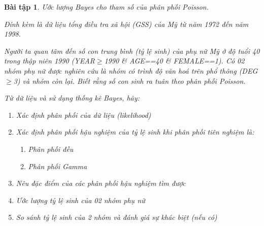 \documentclass[14pt, a4paper]{article}
\theoremstyle{sltheorem}
\newtheorem{baitap}{Bài tập}
\theoremstyle{soltheorem}
\begin{document}
\begin{titlepage}





    \vfill %

\end{titlepage}

\nocite{*}

\newpage

\begin{baitap}
    Ước lượng Bayes cho tham số của phân phối Poisson.

    Đính kèm là dữ liệu tổng điều tra xã hội (GSS) của Mỹ từ năm 1972 đến năm 1998.

    Người ta quan tâm đến số con trung bình (tỷ lệ sinh) của phụ nữ Mỹ ở độ tuổi 40 trong thập niên 1990 (YEAR$\geq$1990 \& AGE==40 \& FEMALE==1). 
    Có 02 nhóm phụ nữ được nghiên cứu là nhóm có trình độ văn hoá trên phổ thông (DEG$\geq$3) và nhóm còn lại. 
    Biết rằng số con sinh ra tuân theo phân phối Poisson.
    
    Từ dữ liệu và sử dụng thống kê Bayes, hãy:

    \begin{enumerate}
        \item Xác định phân phối của dữ liệu (likelihood)
        \item Xác định phân phối hậu nghiệm của tỷ lệ sinh khi phân phối tiên nghiệm là:
        \begin{enumerate}[label=(\alph*)]
            \item Phân phối đều
            \item Phân phối Gamma
        \end{enumerate}
        \item Nêu đặc điểm của các phân phối hậu nghiệm tìm được
        \item Ước lượng tỷ lệ sinh của 02 nhóm phụ nữ
        \item So sánh tỷ lệ sinh của 2 nhóm và đánh giá sự khác biệt (nếu có)
    \end{enumerate}
\end{baitap}
\end{document}
